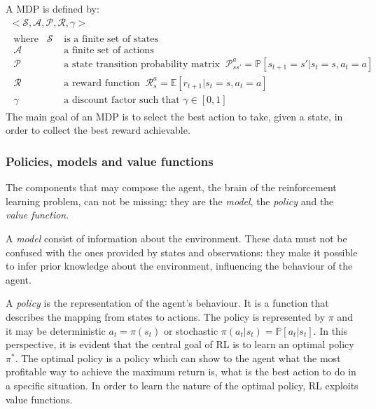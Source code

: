A MDP is defined by:
\begin{equation}\label{eq:mdp}
	\begin{gathered}
		<\mathcal{S}, \mathcal{A}, \mathcal{P}, \mathcal{R}, \gamma>\\
		\begin{aligned}
			\text{where}\hspace{10pt} \mathcal{S} & \text{ is a finite set of states}                     \\
			\mathcal{A}                           & \text{ a finite set of actions}                       \\
			\mathcal{P}                           & \text{ a state transition probability matrix}\;\;
			\mathcal{P}_{ss'}^a = \mathbb{P}[s_{t+1}= s' | s_t = s, a_t = a]                              \\
			\mathcal{R}                           & \text{ a reward function}
			\;\; \mathcal{R}_{s}^a = \mathbb{E}[r_{t+1} | s_t = s, a_t = a]                               \\
			\gamma                                & \text{ a discount factor such that } \gamma \in [0,1]
		\end{aligned}
	\end{gathered}
\end{equation}
The main goal of an MDP is to select the best action to take, given a state, in order to collect the best reward achievable.

\subsubsection{Policies, models and value functions} \label{pmvf}
The components that may compose the agent, the brain of the reinforcement learning problem, can not be missing: they are the \textit{model}, the \textit{policy} and the \textit{value function}.

A \textit{model} consist of information about the environment. These data must not be confused with the ones provided by states and observations: they make it possible to infer prior knowledge about the environment, influencing the behaviour of the agent.

A \textit{policy} is the representation of the agent's behaviour. It is a function that describes the mapping from states to actions.  The policy is represented by $\pi$ and it may be deterministic  $a_t = \pi(s_t)$  or stochastic $\pi(a_t|s_t) = \mathbb{P}[a_t | s_t]$.
In this perspective, it is evident that the central goal of RL is to learn an optimal policy $\pi^*$. The optimal policy is a policy which can show to the agent what the most profitable way to achieve the maximum return is, what is the best action to do in a specific situation. In order to learn the nature of the optimal policy, RL exploits value functions.

